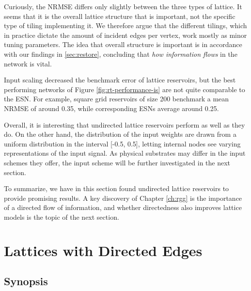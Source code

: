Curiously, the NRMSE differs only slightly between the three types of
lattice. It seems that it is the overall lattice structure that is important,
not the specific type of tiling implementing it. We therefore argue that the
different tilings, which in practice dictate the amount of incident edges per
vertex, work mostly as minor tuning parameters. The idea that overall structure
is important is in accordance with our findings in \ref{sec:restore}, concluding
that \textit{how information flows} in the network is vital.

Input scaling decreased the benchmark error of lattice reservoirs, but the best
performing networks of Figure \ref{fig:rt-performance-is} are not quite
comparable to the ESN. For example, square grid reservoirs of size 200 benchmark
a mean NRMSE of around 0.35, while corresponding ESNs average around 0.25.

Overall, it is interesting that undirected lattice reservoirs perform as well as
they do. On the other hand, the distribution of the input weights are drawn from
a uniform distribution in the interval [-0.5, 0.5], letting internal nodes see
varying representations of the input signal. As physical substrates may differ
in the input schemes they offer, the input scheme will be further investigated
in the next section.

To summarize, we have in this section found undirected lattice reservoirs to
provide promising results. A key discovery of Chapter \ref{ch:rgg} is the
importance of a directed flow of information, and whether directedness also
improves lattice models is the topic of the next section.

\section{Lattices with Directed Edges}
\label{sec:lat-dir-edge}

\subsection{Synopsis}

